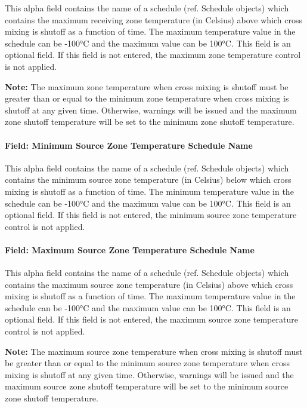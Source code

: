 This alpha field contains the name of a schedule (ref. Schedule objects) which contains the maximum receiving zone temperature (in Celsius) above which cross mixing is shutoff as a function of time. The maximum temperature value in the schedule can be -100°C and the maximum value can be 100°C. This field is an optional field. If this field is not entered, the maximum zone temperature control is not applied.

\textbf{Note:} The maximum zone temperature when cross mixing is shutoff must be greater than or equal to the minimum zone temperature when cross mixing is shutoff at any given time. Otherwise, warnings will be issued and the maximum zone shutoff temperature will be set to the minimum zone shutoff temperature.

\paragraph{Field: Minimum Source Zone Temperature Schedule Name}\label{field-minimum-source-zone-temperature-schedule-name-1}

This alpha field contains the name of a schedule (ref. Schedule objects) which contains the minimum source zone temperature (in Celsius) below which cross mixing is shutoff as a function of time. The minimum temperature value in the schedule can be -100°C and the maximum value can be 100°C. This field is an optional field. If this field is not entered, the minimum source zone temperature control is not applied.

\paragraph{Field: Maximum Source Zone Temperature Schedule Name}\label{field-maximum-source-zone-temperature-schedule-name-1}

This alpha field contains the name of a schedule (ref. Schedule objects) which contains the maximum source zone temperature (in Celsius) above which cross mixing is shutoff as a function of time. The maximum temperature value in the schedule can be -100°C and the maximum value can be 100°C. This field is an optional field. If this field is not entered, the maximum source zone temperature control is not applied.

\textbf{Note:} The maximum source zone temperature when cross mixing is shutoff must be greater than or equal to the minimum source zone temperature when cross mixing is shutoff at any given time. Otherwise, warnings will be issued and the maximum source zone shutoff temperature will be set to the minimum source zone shutoff temperature.

